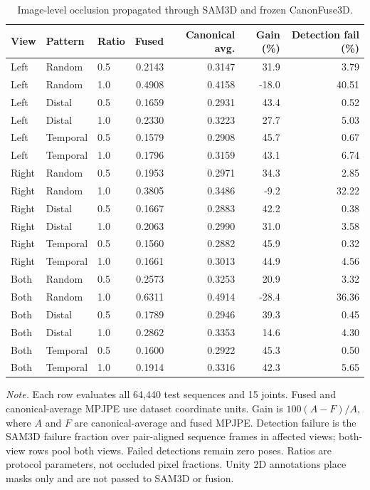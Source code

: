 \begin{table}[t]
\centering
\caption{Image-level occlusion propagated through SAM3D and frozen CanonFuse3D.}
\label{tab:image_occlusion}
\footnotesize
\setlength{\tabcolsep}{5pt}
\begin{tabular}{lllrrrr}
\toprule
View & Pattern & Ratio & Fused & Canonical avg. & Gain (\%) & Detection fail (\%) \\
\midrule
Left & Random & 0.5 & 0.2143 & 0.3147 & 31.9 & 3.79 \\
Left & Random & 1.0 & 0.4908 & 0.4158 & -18.0 & 40.51 \\
Left & Distal & 0.5 & 0.1659 & 0.2931 & 43.4 & 0.52 \\
Left & Distal & 1.0 & 0.2330 & 0.3223 & 27.7 & 5.03 \\
Left & Temporal & 0.5 & 0.1579 & 0.2908 & 45.7 & 0.67 \\
Left & Temporal & 1.0 & 0.1796 & 0.3159 & 43.1 & 6.74 \\
Right & Random & 0.5 & 0.1953 & 0.2971 & 34.3 & 2.85 \\
Right & Random & 1.0 & 0.3805 & 0.3486 & -9.2 & 32.22 \\
Right & Distal & 0.5 & 0.1667 & 0.2883 & 42.2 & 0.38 \\
Right & Distal & 1.0 & 0.2063 & 0.2990 & 31.0 & 3.58 \\
Right & Temporal & 0.5 & 0.1560 & 0.2882 & 45.9 & 0.32 \\
Right & Temporal & 1.0 & 0.1661 & 0.3013 & 44.9 & 4.56 \\
Both & Random & 0.5 & 0.2573 & 0.3253 & 20.9 & 3.32 \\
Both & Random & 1.0 & 0.6311 & 0.4914 & -28.4 & 36.36 \\
Both & Distal & 0.5 & 0.1789 & 0.2946 & 39.3 & 0.45 \\
Both & Distal & 1.0 & 0.2862 & 0.3353 & 14.6 & 4.30 \\
Both & Temporal & 0.5 & 0.1600 & 0.2922 & 45.3 & 0.50 \\
Both & Temporal & 1.0 & 0.1914 & 0.3316 & 42.3 & 5.65 \\
\bottomrule
\end{tabular}
\vspace{0.3em}
\parbox{0.96\textwidth}{\footnotesize \textit{Note.} Each row evaluates all 64,440 test sequences and 15 joints. Fused and canonical-average MPJPE use dataset coordinate units. Gain is $100(A-F)/A$, where $A$ and $F$ are canonical-average and fused MPJPE. Detection failure is the SAM3D failure fraction over pair-aligned sequence frames in affected views; both-view rows pool both views. Failed detections remain zero poses. Ratios are protocol parameters, not occluded pixel fractions. Unity 2D annotations place masks only and are not passed to SAM3D or fusion.}
\end{table}
